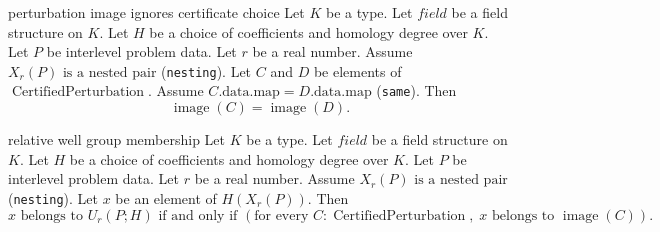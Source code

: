 \begin{cleanresult}{perturbation image ignores certificate choice}
Let $K$ be a type.
Let $\mathit{field}$ be a field structure on $K$.
Let $H$ be a choice of coefficients and homology degree over $K$.
Let $P$ be interlevel problem data.
Let $r$ be a real number.
Assume $X_{r}(P)\text{ is a nested pair}$ (\texttt{nesting}).
Let $C$ and $D$ be elements of $\operatorname{CertifiedPerturbation}$.
Assume $C.\mathrm{data}.\mathrm{map}=D.\mathrm{data}.\mathrm{map}$ (\texttt{same}).
Then \[\operatorname{image}(C)=\operatorname{image}(D).\]
\end{cleanresult}

\begin{cleanresult}{relative well group membership}
Let $K$ be a type.
Let $\mathit{field}$ be a field structure on $K$.
Let $H$ be a choice of coefficients and homology degree over $K$.
Let $P$ be interlevel problem data.
Let $r$ be a real number.
Assume $X_{r}(P)\text{ is a nested pair}$ (\texttt{nesting}).
Let $x$ be an element of $H(X_{r}(P))$.
Then \[x\text{ belongs to }U_{r}(P;H)\text{ if and only if }\left(\text{for every }C : \operatorname{CertifiedPerturbation},\; x\text{ belongs to }\operatorname{image}(C)\right).\]
\par{}
\end{cleanresult}

